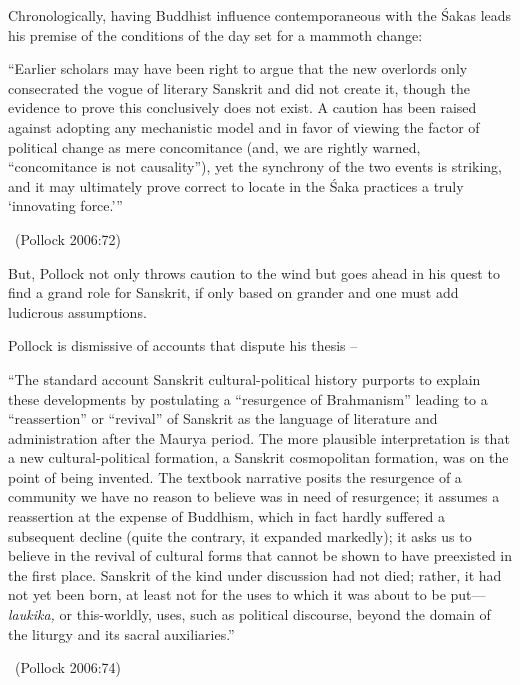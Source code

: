 Chronologically, having Buddhist influence contemporaneous with the Śakas leads his premise of the conditions of the day set for a mammoth change:

\begin{myquote}
“Earlier scholars may have been right to argue that the new overlords only consecrated the vogue of literary Sanskrit and did not create it, though the evidence to prove this conclusively does not exist. A caution has been raised against adopting any mechanistic model and in favor of viewing the factor of political change as mere concomitance (and, we are rightly warned, “concomitance is not causality”), yet the synchrony of the two events is striking, and it may ultimately prove correct to locate in the Śaka practices a truly ‘innovating force.’” 

~\hfill (Pollock 2006:72)
\end{myquote}

But, Pollock not only throws caution to the wind but goes ahead in his quest to find a grand role for Sanskrit, if only based on grander and one must add ludicrous assumptions.

Pollock is dismissive of accounts that dispute his thesis –

\begin{myquote}
“The standard account Sanskrit cultural-political history purports to explain these developments by postulating a “resurgence of Brahmanism” leading to a “reassertion” or “revival” of Sanskrit as the language of literature and administration after the Maurya period. The more plausible interpretation is that a new cultural-political formation, a Sanskrit cosmopolitan formation, was on the point of being invented. The textbook narrative posits the resurgence of a community we have no reason to believe was in need of resurgence; it assumes a reassertion at the expense of Buddhism, which in fact hardly suffered a subsequent decline (quite the contrary, it expanded markedly); it asks us to believe in the revival of cultural forms that cannot be shown to have preexisted in the first place. Sanskrit of the kind under discussion had not died; rather, it had not yet been born, at least not for the uses to which it was about to be put—\textit{laukika,} or this-worldly, uses, such as political discourse, beyond the domain of the liturgy and its sacral auxiliaries.” 

~\hfill (Pollock 2006:74)
\end{myquote}

